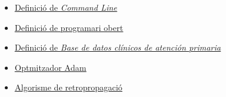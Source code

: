 \documentclass[a4paper,12pt]{report}
\begin{document}
\begin{itemize}
    \item \href{https://es.wikipedia.org/wiki/Interfaz_de_línea_de_comandos}{\underline{Definició de \textit{Command Line}}}
    \item \href{https://www.ibm.com/es-es/topics/open-source}{\underline{Definició de programari obert}}
    \item \href{https://www.sanidad.gob.es/estadEstudios/estadisticas/estadisticas/estMinisterio/SIAP/home.htm}{\underline{Definició de \textit{Base de datos clínicos de atención primaria}}}
    \item \href{https://www.askpython.com/python/examples/adam-optimizer}{\underline{Optmitzador Adam}}
    \item \href{https://www.askpython.com/python/examples/backpropagation-in-python}{\underline{Algorisme de retropropagació}}
\end{itemize}
\end{document}
